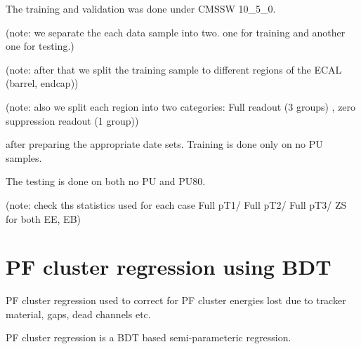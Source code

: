 The training and validation was done under CMSSW 10_5_0.

(note: we separate the each data sample into two. one for training and another one for testing.)

(note: after that we split the training sample to different regions of the ECAL (barrel, endcap))

(note: also we split each region into two categories: Full readout (3 groups) , zero suppression readout (1 group))


after preparing the appropriate date sets. Training is done only on no PU samples.

The testing is done on both no PU and PU80. 

(note: check ths statistics used for each case Full pT1/ Full pT2/ Full pT3/ ZS for both EE, EB)



\section{PF cluster regression using BDT}

PF cluster regression used to correct for PF cluster energies lost due to tracker material, gaps, dead channels etc.

PF cluster regression is a BDT based semi-parameteric regression. 


